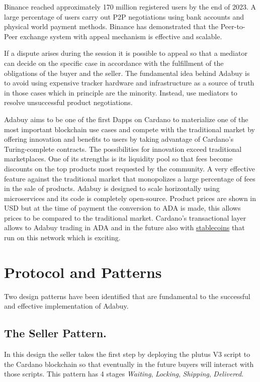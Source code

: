 \documentclass[12pt]{article}
\begin{document}
Binance reached approximately 170 million registered users by the end of 2023. A large percentage of users carry out P2P negotiations using bank accounts and physical world payment methods. Binance has demonstrated that the Peer-to-Peer exchange system with appeal mechanism is effective and scalable.

If a dispute arises during the session it is possible to appeal so that a mediator can decide on the specific case in accordance with the fulfillment of the obligations of the buyer and the seller. The fundamental idea behind Adabuy is to avoid using expensive tracker hardware and infrastructure as a source of truth in those cases which in principle are the minority. Instead, use mediators to resolve unsuccessful product negotiations.

Adabuy aims to be one of the first Dapps on Cardano to materialize one of the most important blockchain use cases and compete with the traditional market by offering innovation and benefits to users by taking advantage of Cardano's Turing-complete contracts. The possibilities for innovation exceed traditional marketplaces. One of its strengths is its liquidity pool so that fees become discounts on the top products most requested by the community. A very effective feature against the traditional market that monopolizes a large percentage of fees in the sale of products. Adabuy is designed to scale horizontally using microservices and its code is completely open-source.
Product prices are shown in USD but at the time of payment the conversion to ADA is made, this allows prices to be compared to the traditional market. Cardano's transactional layer allows to Adabuy trading in ADA and in the future also with \underline{stablecoins} that run on this network which is exciting.

\section{ Protocol and Patterns }

Two design patterns have been identified that are fundamental to the successful and effective implementation of Adabuy.

\subsection { The Seller Pattern. } 

In this design the seller takes the first step by deploying the plutus V3 script to the Cardano blockchain so that eventually in the future buyers will interact with those scripts. This pattern has 4 stages \emph{Waiting}, \emph{Locking}, \emph{Shipping}, \emph{Delivered}.
\end{document}
